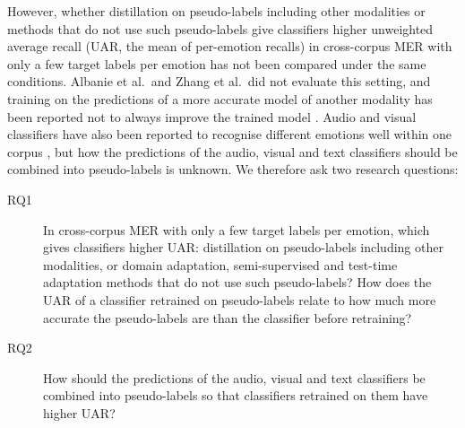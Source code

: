 However, whether distillation on pseudo-labels including other modalities or methods that do not use such pseudo-labels give classifiers higher unweighted average recall (UAR, the mean of per-emotion recalls) in cross-corpus MER with only a few target labels per emotion has not been compared under the same conditions. Albanie et al.\ and Zhang et al.\ did not evaluate this setting, and training on the predictions of a more accurate model of another modality has been reported not to always improve the trained model \cite{xue2023mfh}. Audio and visual classifiers have also been reported to recognise different emotions well within one corpus \cite{busso2004}, but how the predictions of the audio, visual and text classifiers should be combined into pseudo-labels is unknown. We therefore ask two research questions:
\begin{description}
\item[RQ1] In cross-corpus MER with only a few target labels per emotion, which gives classifiers higher UAR: distillation on pseudo-labels including other modalities, or domain adaptation, semi-supervised and test-time adaptation methods that do not use such pseudo-labels? How does the UAR of a classifier retrained on pseudo-labels relate to how much more accurate the pseudo-labels are than the classifier before retraining?
\item[RQ2] How should the predictions of the audio, visual and text classifiers be combined into pseudo-labels so that classifiers retrained on them have higher UAR?
\end{description}

